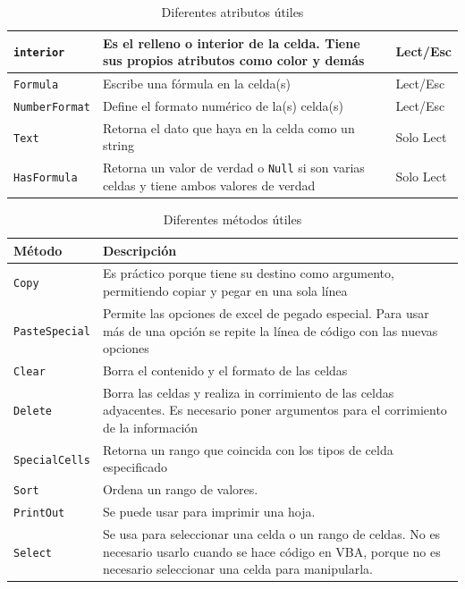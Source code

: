 \begin{table}[H]
\begin{tabular}{|m{}|m{}|m{}|}
        \texttt{interior}     & Es el relleno o interior de la celda. Tiene sus propios atributos como color y demás  & Lect/Esc  \\ \hline
        \texttt{Formula}      & Escribe una fórmula en la celda(s)   & Lect/Esc  \\ \hline
        \texttt{NumberFormat} & Define el formato numérico de la(s) celda(s)   & Lect/Esc  \\ \hline
        \texttt{Text}         & Retorna el dato que haya en la celda como un string   & Solo Lect  \\ \hline
        \texttt{HasFormula}   & Retorna un valor de verdad o \texttt{Null} si son varias celdas y tiene ambos valores de verdad   & Solo Lect  \\ \hline
    \end{tabular}
    \caption{Diferentes atributos útiles}
    \label{tab_rangea}
\end{table}



\begin{table}[H]
    \centering
    \begin{tabular}{|m{}|m{}|}
        \hline
        \rowcolor{lightgray} \textbf{Método} & \textbf{Descripción} \\ \hline \hline
        \texttt{Copy}         & Es práctico porque tiene su destino como argumento, permitiendo copiar y pegar en una sola línea \\ \hline
        \texttt{PasteSpecial} & Permite las opciones de excel de pegado especial. Para usar más de una opción se repite la línea de código con las nuevas opciones \\ \hline
        \texttt{Clear}        & Borra el contenido y el formato de las celdas  \\ \hline
        \texttt{Delete}       & Borra las celdas y realiza in corrimiento de las celdas adyacentes. Es necesario poner argumentos para el corrimiento de la información   \\ \hline
        \texttt{SpecialCells} & Retorna un rango que coincida con los tipos de celda especificado \\ \hline
        \texttt{Sort}         & Ordena un rango de valores.   \\ \hline
        \texttt{PrintOut}     & Se puede usar para imprimir una hoja. \\ \hline
        \texttt{Select}       & Se usa para seleccionar una celda o un rango de celdas. No es necesario usarlo cuando se hace código en VBA, porque no es necesario seleccionar una celda para manipularla.  \\ \hline
    \end{tabular}
    \caption{Diferentes métodos útiles}
    \label{tab_rangem}
\end{table}

